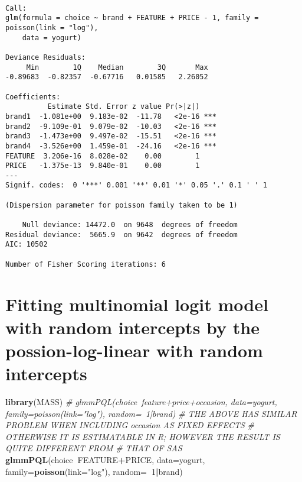 \documentclass[]{book}
\newenvironment{Shaded}{\begin{snugshade}}{\end{snugshade}}
\newcommand{\CommentTok}[1]{\textcolor[rgb]{0.56,0.35,0.01}{\textit{#1}}}
\newcommand{\DataTypeTok}[1]{\textcolor[rgb]{0.13,0.29,0.53}{#1}}
\newcommand{\DecValTok}[1]{\textcolor[rgb]{0.00,0.00,0.81}{#1}}
\newcommand{\KeywordTok}[1]{\textcolor[rgb]{0.13,0.29,0.53}{\textbf{#1}}}
\newcommand{\NormalTok}[1]{#1}
\newcommand{\OperatorTok}[1]{\textcolor[rgb]{0.81,0.36,0.00}{\textbf{#1}}}
\newcommand{\StringTok}[1]{\textcolor[rgb]{0.31,0.60,0.02}{#1}}
\begin{document}
\begin{verbatim}

Call:
glm(formula = choice ~ brand + FEATURE + PRICE - 1, family = poisson(link = "log"), 
    data = yogurt)

Deviance Residuals: 
     Min        1Q    Median        3Q       Max  
-0.89683  -0.82357  -0.67716   0.01585   2.26052  

Coefficients:
          Estimate Std. Error z value Pr(>|z|)    
brand1  -1.081e+00  9.183e-02  -11.78   <2e-16 ***
brand2  -9.109e-01  9.079e-02  -10.03   <2e-16 ***
brand3  -1.473e+00  9.497e-02  -15.51   <2e-16 ***
brand4  -3.526e+00  1.459e-01  -24.16   <2e-16 ***
FEATURE  3.206e-16  8.028e-02    0.00        1    
PRICE   -1.375e-13  9.840e-01    0.00        1    
---
Signif. codes:  0 '***' 0.001 '**' 0.01 '*' 0.05 '.' 0.1 ' ' 1

(Dispersion parameter for poisson family taken to be 1)

    Null deviance: 14472.0  on 9648  degrees of freedom
Residual deviance:  5665.9  on 9642  degrees of freedom
AIC: 10502

Number of Fisher Scoring iterations: 6
\end{verbatim}

\hypertarget{fitting-multinomial-logit-model-with-random-intercepts-by-the-possion-log-linear-with-random-intercepts}{%
\section{Fitting multinomial logit model with random intercepts by the possion-log-linear with random intercepts}\label{fitting-multinomial-logit-model-with-random-intercepts-by-the-possion-log-linear-with-random-intercepts}}

\begin{Shaded}
\begin{Highlighting}[]
\KeywordTok{library}\NormalTok{(MASS)}
\CommentTok{# glmmPQL(choice~feature+price+occasion, data=yogurt, family=poisson(link="log"), random=~1|brand)}
\CommentTok{# THE ABOVE HAS SIMILAR PROBLEM WHEN INCLUDING occasion AS FIXED EFFECTS}
\CommentTok{# OTHERWISE IT IS ESTIMATABLE IN R; HOWEVER THE RESULT IS QUITE DIFFERENT FROM # THAT OF SAS}
\KeywordTok{glmmPQL}\NormalTok{(choice}\OperatorTok{~}\NormalTok{FEATURE}\OperatorTok{+}\NormalTok{PRICE, }\DataTypeTok{data=}\NormalTok{yogurt, }\DataTypeTok{family=}\KeywordTok{poisson}\NormalTok{(}\DataTypeTok{link=}\StringTok{"log"}\NormalTok{), }\DataTypeTok{random=}\OperatorTok{~}\DecValTok{1}\OperatorTok{|}\NormalTok{brand)}
\end{Highlighting}
\end{Shaded}
\end{document}
